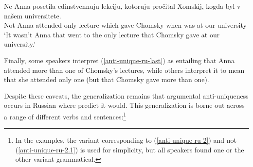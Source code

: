 \documentclass{article}
\begin{document}
\begin{exe}
	\ex \label{anti-unique-ru-2.1} \gll Ne Anna posetila edinstvennuju lekciju, kotoruju pro\v{c}ital Xomskij, kogda byl v na\v{s}em universitete.\\
	Not Anna attended only lecture which gave Chomsky when was at our university\\
	\glt `It wasn't Anna that went to the only lecture that Chomsky gave at our university.'
\end{exe}

Finally, some speakers interpret (\ref{anti-unique-ru-last}) as entailing that Anna attended more than one of Chomsky's lectures, while others interpret it to mean that she attended only one (but that Chomsky gave more than one).

Despite these caveats, the generalization remains that argumental anti-uniqueness occurs in Russian where \citeauthor{cb2015} predict it would. This generalization is borne out across a range of different verbs and sentences:\footnote{In the examples, the variant corresponding to (\ref{anti-unique-ru-2}) and not (\ref{anti-unique-ru-2.1}) is used for simplicity, but all speakers found one or the other variant grammatical.}
\end{document}
